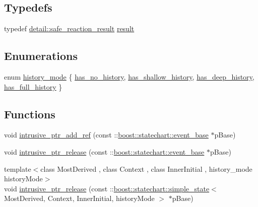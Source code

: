 \subsection*{Typedefs}
\begin{DoxyCompactItemize}
\item 
typedef \mbox{\hyperlink{classboost_1_1statechart_1_1detail_1_1safe__reaction__result}{detail\+::safe\+\_\+reaction\+\_\+result}} \mbox{\hyperlink{namespaceboost_1_1statechart_abe807f6598b614d6d87bb951ecd92331}{result}}
\end{DoxyCompactItemize}
\subsection*{Enumerations}
\begin{DoxyCompactItemize}
\item 
enum \mbox{\hyperlink{namespaceboost_1_1statechart_a9c4ec64d7a0422b8b9c97b489f731372}{history\+\_\+mode}} \{ \mbox{\hyperlink{namespaceboost_1_1statechart_a9c4ec64d7a0422b8b9c97b489f731372a0a83ee30095cf16e41ec634de52ad636}{has\+\_\+no\+\_\+history}}, 
\mbox{\hyperlink{namespaceboost_1_1statechart_a9c4ec64d7a0422b8b9c97b489f731372a91f197dd8c8935ec1a9328dfc5f90b43}{has\+\_\+shallow\+\_\+history}}, 
\mbox{\hyperlink{namespaceboost_1_1statechart_a9c4ec64d7a0422b8b9c97b489f731372aac03603fa90405ad5de45cc858477c7d}{has\+\_\+deep\+\_\+history}}, 
\mbox{\hyperlink{namespaceboost_1_1statechart_a9c4ec64d7a0422b8b9c97b489f731372ab8908e987c54cf2d9ef42a5c7298d159}{has\+\_\+full\+\_\+history}}
 \}
\end{DoxyCompactItemize}
\subsection*{Functions}
\begin{DoxyCompactItemize}
\item 
void \mbox{\hyperlink{namespaceboost_1_1statechart_af28fc7e043b5d8c4434e2b91a7f813fe}{intrusive\+\_\+ptr\+\_\+add\+\_\+ref}} (const \+::\mbox{\hyperlink{classboost_1_1statechart_1_1event__base}{boost\+::statechart\+::event\+\_\+base}} $\ast$p\+Base)
\item 
void \mbox{\hyperlink{namespaceboost_1_1statechart_a1920a5b283c13c30ecd4aeb5b9499aeb}{intrusive\+\_\+ptr\+\_\+release}} (const \+::\mbox{\hyperlink{classboost_1_1statechart_1_1event__base}{boost\+::statechart\+::event\+\_\+base}} $\ast$p\+Base)
\item 
{\footnotesize template$<$class Most\+Derived , class Context , class Inner\+Initial , history\+\_\+mode history\+Mode$>$ }\\void \mbox{\hyperlink{namespaceboost_1_1statechart_a16a84edc3e19176233fbdf977c1aa7ec}{intrusive\+\_\+ptr\+\_\+release}} (const \+::\mbox{\hyperlink{classboost_1_1statechart_1_1simple__state}{boost\+::statechart\+::simple\+\_\+state}}$<$ Most\+Derived, Context, Inner\+Initial, history\+Mode $>$ $\ast$p\+Base)
\end{DoxyCompactItemize}


